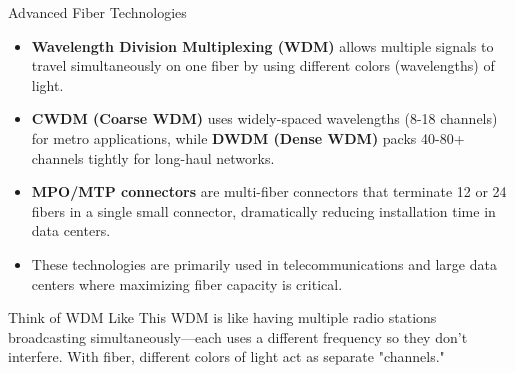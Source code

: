 \documentclass[aspectratio=169]{beamer}
\begin{document}
\begin{frame}{Advanced Fiber Technologies}
    \begin{itemize}
        \item \textbf{Wavelength Division Multiplexing (WDM)} allows multiple signals to travel simultaneously on one fiber by using different colors (wavelengths) of light.
        \item \textbf{CWDM (Coarse WDM)} uses widely-spaced wavelengths (8-18 channels) for metro applications, while \textbf{DWDM (Dense WDM)} packs 40-80+ channels tightly for long-haul networks.
        \item \textbf{MPO/MTP connectors} are multi-fiber connectors that terminate 12 or 24 fibers in a single small connector, dramatically reducing installation time in data centers.
        \item These technologies are primarily used in telecommunications and large data centers where maximizing fiber capacity is critical.
    \end{itemize}
    
    \vspace{0.3cm}
    \begin{block}{Think of WDM Like This}
        WDM is like having multiple radio stations broadcasting simultaneously---each uses a different frequency so they don't interfere. With fiber, different colors of light act as separate "channels."
    \end{block}
\end{frame}
\end{document}

